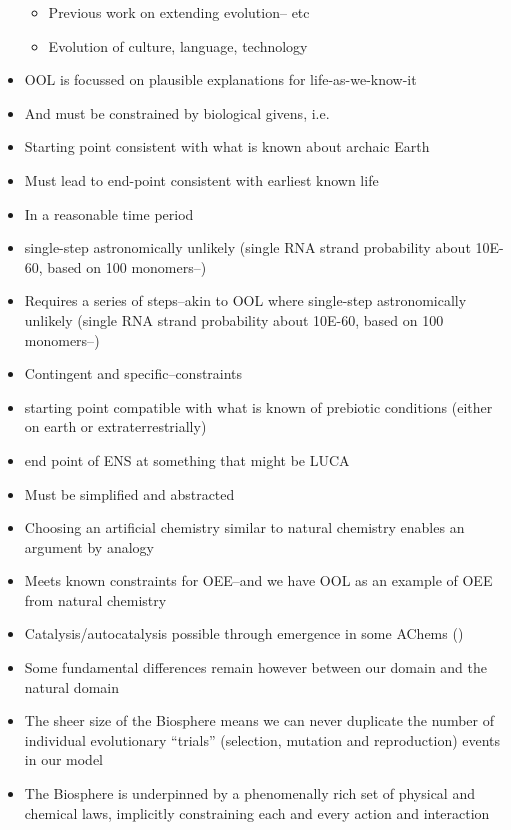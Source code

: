 \begin{itemize}
	      \begin{itemize}
	      	\item
	      	      Previous work on extending evolution--\autocite{Bourrat2015} etc
	      	\item
	      	      Evolution of culture, language, technology
	      \end{itemize}
	\item
	      OOL is focussed on plausible explanations for life-as-we-know-it
	\item
	      And must be constrained by biological givens, i.e.
	\item
	      Starting point consistent with what is known about archaic Earth
	\item
	      Must lead to end-point consistent with earliest known life
	\item
	      In a reasonable time period
	\item
	      single-step astronomically unlikely (single RNA strand probability
	      about 10E-60, based on 100 monomers--\autocite{Pascal2013})
	\item
	      Requires a series of steps--akin to OOL where single-step
	      astronomically unlikely (single RNA strand probability about 10E-60,
	      based on 100 monomers--\autocite{Pascal2013})
	\item
	      Contingent and specific--constraints
	\item
	      starting point compatible with what is known of prebiotic conditions
	      (either on earth or extraterrestrially)
	\item
	      end point of ENS at something that might be LUCA
	\item
	      Must be simplified and abstracted
	\item
	      Choosing an artificial chemistry similar to natural chemistry enables
	      an argument by analogy
	\item
	      Meets known constraints for OEE--and we have OOL as an example of OEE
	      from natural chemistry
	\item
	      Catalysis/autocatalysis possible through emergence in some AChems
	      (\eg \autocite{Virgo2013})
	\item
	      Some fundamental differences remain however between our domain and the
	      natural domain
	\item
	      The sheer size of the Biosphere means we can never duplicate the
	      number of individual evolutionary ``trials'' (selection, mutation and
	      reproduction) events in our model
	\item
	      The Biosphere is underpinned by a phenomenally rich set of physical
	      and chemical laws, implicitly constraining each and every action and
	      interaction
\end{itemize}


